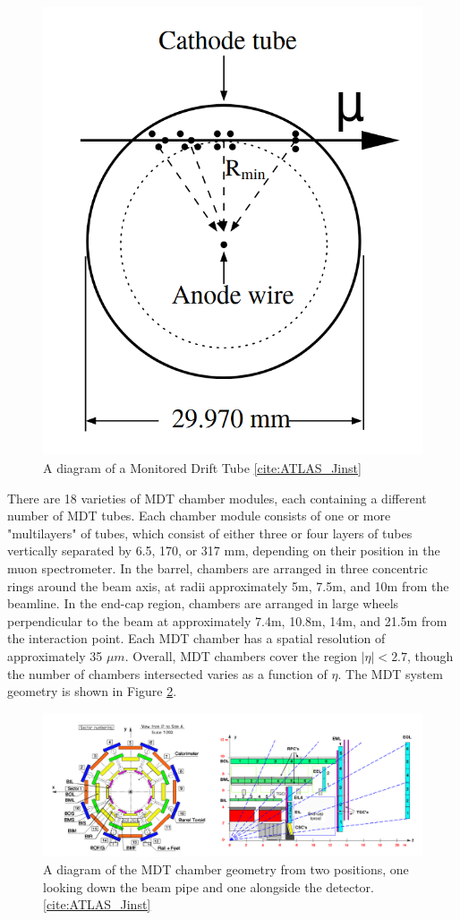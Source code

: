 \begin{figure}
  \includegraphics[width=0.5\linewidth]{figures/detector_chapter/MDT.png}
  \caption{A diagram of a Monitored Drift Tube \ref{cite:ATLAS_Jinst}}
  \label{fig:MDT}
\end{figure}

There are 18 varieties of MDT chamber modules, each containing a different number of MDT tubes. Each chamber module consists of one or more "multilayers" of tubes, which consist of either three or four layers of tubes vertically separated by 6.5, 170, or 317 mm, depending on their position in the muon spectrometer. In the barrel, chambers are arranged in three concentric rings around the beam axis, at radii approximately 5m, 7.5m, and 10m from the beamline. In the end-cap region, chambers are arranged in large wheels perpendicular to the beam at approximately 7.4m, 10.8m, 14m, and 21.5m from the interaction point. Each MDT chamber has a spatial resolution of approximately 35 $\mu m$. Overall, MDT chambers cover the region $ |\eta | < 2.7$, though the number of chambers intersected varies as a function of $\eta$. The MDT system geometry is shown in Figure \ref{fig:MDTChamber}. 

\begin{figure}[ht!]
  \includegraphics[width=\linewidth]{figures/detector_chapter/MDTChamber.png}
  \caption{A diagram of the MDT chamber geometry from two positions, one looking down the beam pipe and one alongside the detector. \ref{cite:ATLAS_Jinst}}
  \label{fig:MDTChamber}
\end{figure}

